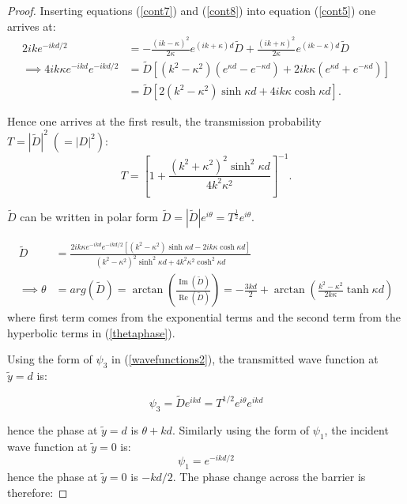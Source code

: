 \documentclass{article}
\begin{document}
\begin{proof}
\noindent Inserting equations (\ref{cont7}) and (\ref{cont8}) into equation (\ref{cont5}) one arrives at:
\begin{subequations}
\begin{align}
	2ike^{-ikd/2} &= -\frac{(ik-\kappa)^2}{2\kappa}e^{(ik+\kappa)d}\tilde{D}+\frac{(ik+\kappa)^2}{2\kappa}e^{(ik-\kappa)d}\tilde{D} \label{cont9} \\
	\implies 4ik\kappa e^{-ikd}e^{-ikd/2} &= \tilde{D}[(k^2-\kappa^2)(e^{\kappa d}-e^{-\kappa d})+2ik\kappa(e^{\kappa d}+e^{-\kappa d})] \label{cont10}\\
						      &= \tilde{D}[2(k^2-\kappa^2)\sinh{\kappa d}+4ik\kappa \cosh{\kappa d}] \label{cont11}.
\end{align}
\end{subequations}

\noindent Hence one arrives at the first result, the transmission probability $T = |\tilde{D}|^2 \;(=|D|^2)$:
\begin{equation}
	T = \left[1+\frac{(k^2+\kappa^2)^2\sinh^2{\kappa d}}{4k^2\kappa^2}\right]^{-1}.
	\label{transmissionprobability}
\end{equation}

\noindent $\tilde{D}$ can be written in polar form $\tilde{D} = |\tilde{D}|e^{i\theta} = T^{\frac{1}{2}}e^{i\theta}$.

\begin{subequations}
\begin{align}
	\tilde{D}&=\frac{2ik\kappa e^{-ikd}e^{-ikd/2}\left[(k^2-\kappa^2)\sinh{\kappa d}-2ik\kappa\cosh{\kappa d}\right]}{(k^2-\kappa^2)^2\sinh^2{\kappa d}+4k^2\kappa^2\cosh^2{\kappa d}}\\
	\implies \theta &= arg(\tilde{D})=\arctan\left(\frac{\operatorname{Im}(\tilde{D})}{\operatorname{Re}(\tilde{D})}\right) = -\frac{3kd}{2}+\arctan\left(\frac{k^2-\kappa^2}{2k\kappa}\tanh{\kappa d}\right) \label{thetaphase}
\end{align}
\end{subequations}
\noindent where first term comes from the exponential terms and the second term from the hyperbolic terms in (\ref{thetaphase}).

\noindent Using the form of $\psi_3$ in (\ref{wavefunctions2}), the transmitted wave function at $\tilde{y} = d$ is:

\begin{equation}
	\psi_3=\tilde{D}e^{ikd} = T^{1/2}e^{i\theta}e^{ikd}	
\end{equation}

\noindent hence the phase at $\tilde{y} =d$ is $\theta + kd$. Similarly using the form of $\psi_1$, the incident wave function at $\tilde{y} = 0$ is:
\begin{equation}
	\psi_1=e^{-ikd/2}
\end{equation}
\noindent hence the phase at $\tilde{y}=0$ is $-kd/2$. The phase change across the barrier is therefore:


\end{proof}
\end{document}
